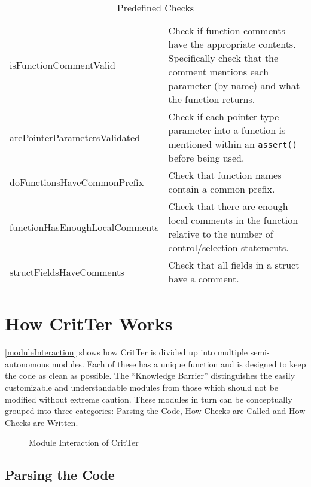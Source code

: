 \documentclass[12pt]{report}
\newcommand{\programName}{CritTer\xspace}
\begin{document}
\begin{table}
\begin{center}
\begin{tabular}{l p{9cm}}
		isFunctionCommentValid & Check if function comments have the appropriate contents. Specifically check that the comment mentions each parameter (by name) and what the function returns. \\
		arePointerParametersValidated & Check if each pointer type parameter into a function is mentioned within an \lstinline!assert()! before being used. \\
		doFunctionsHaveCommonPrefix & Check that function names contain a common prefix. \\
		functionHasEnoughLocalComments & Check that there are enough local comments in the function relative to the number of control/selection statements. \\
		structFieldsHaveComments & Check that all fields in a struct have a comment. \\
		\bottomrule
	\end{tabular}
	\end{center}
\caption{Predefined Checks}
\label{predefinedChecks}
\end{table}

\chapter{How \programName Works}
\label{howItWorks}

\autoref{moduleInteraction} shows how \programName is divided up into multiple semi-autonomous 
modules. Each of these has a unique function and is designed to keep the code as clean as possible. 
The ``Knowledge Barrier'' distinguishes the easily customizable and understandable modules from 
those which should not be modified without extreme caution. These modules in turn can be 
conceptually grouped into three categories: \hyperref[parsingTheCode]{Parsing the Code}, 
\hyperref[howChecksAreCalled]{How Checks are Called} and 
\hyperref[howChecksAreWritten]{How Checks are Written}.

\begin{figure}[h!]
\begin{center}
\end{center}
\caption{Module Interaction of \programName}
\label{moduleInteraction}
\end{figure}

\section{Parsing the Code}
\label{parsingTheCode}
\end{document}
